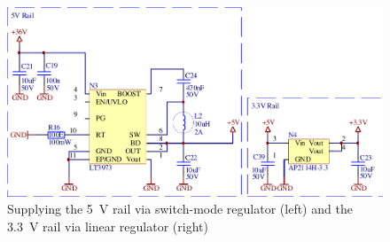 
\begin{figure}[th!]
    \center
    \includegraphics[width=.67\textwidth]{images/circuit/5v-3v-rails.pdf}
    \caption{Supplying the \SI{5}{\volt} rail via switch-mode regulator (left) and the \SI{3.3}{\volt} rail via linear regulator (right)}
    \label{fig:circuit:rails}
\end{figure}

